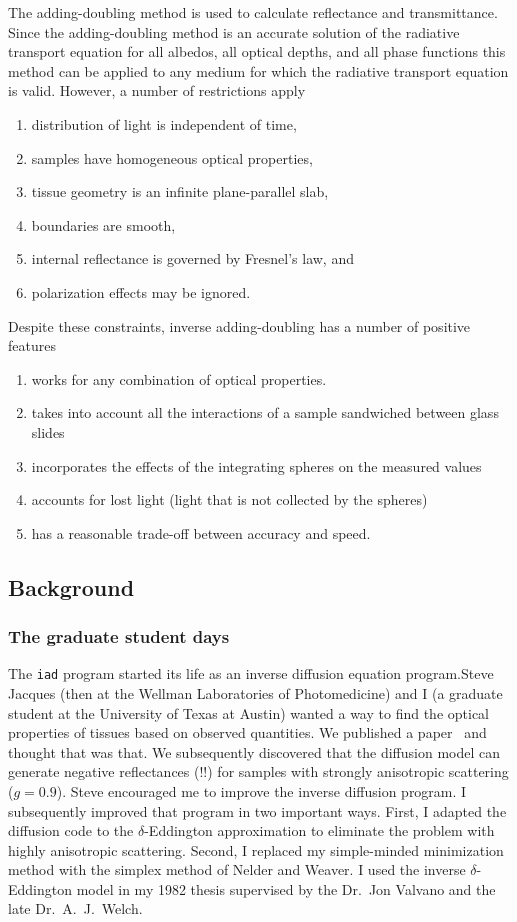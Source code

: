 \documentclass{article}
\newcommand\iadprog{\texttt{iad}}
\begin{document}
The adding-doubling method is used to calculate reflectance and transmittance.
Since the adding-doubling method is an accurate solution of the radiative
transport equation for all albedos, all optical depths, and all phase functions
this method can be applied to any medium for which the radiative transport
equation is valid.  However, a number of restrictions apply
\begin{enumerate}
\item
distribution of light is independent of time,
\item
samples have homogeneous optical properties,
\item
tissue geometry is an infinite plane-parallel slab,
\item
boundaries are smooth,
\item
internal reflectance is governed by Fresnel's law, and
\item
polarization effects may be ignored.
\end{enumerate}
Despite these constraints, inverse adding-doubling has a number of positive features
\begin{enumerate}
\item
works for any combination of optical properties.
\item
takes into account all the interactions of a sample sandwiched
between glass slides
\item
incorporates the effects of the integrating spheres on the
measured values
\item
accounts for lost light (light that is not collected by the spheres)
\item
has a reasonable trade-off between accuracy and speed.
\end{enumerate}

\subsection{Background}

\subsubsection*{The graduate student days}
The \iadprog{} program started its life as an inverse diffusion equation program.Steve Jacques (then at the Wellman
Laboratories of Photomedicine) and I (a graduate student at the University of Texas at
Austin) wanted a way to find the optical properties of tissues based on observed quantities. We published a 
paper~\cite{jacques87a} and thought that was that.  We subsequently discovered that
the diffusion model can generate negative reflectances (!!) for samples with strongly
anisotropic scattering ($g=0.9$).  Steve encouraged me to improve the inverse diffusion
program.  I subsequently improved that program in two important ways.  First, I
adapted the diffusion code to the $\delta$-Eddington approximation to eliminate the problem with highly
anisotropic scattering. Second, I replaced my simple-minded minimization method with the
simplex method of Nelder and Weaver.  I used the inverse $\delta$-Eddington
model in my 1982 thesis supervised by the Dr.\ Jon Valvano and the late Dr.\ A.\ J.\ Welch.
\end{document}

